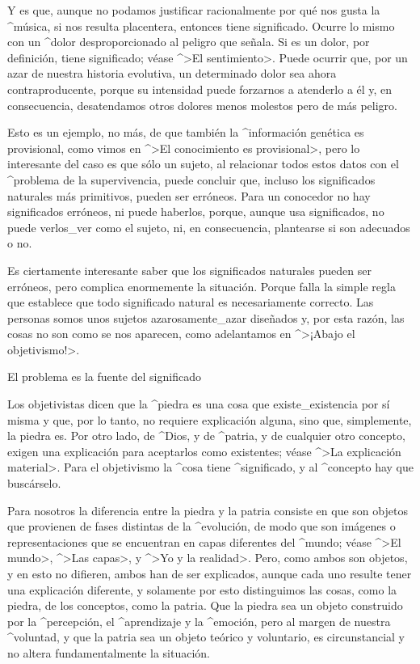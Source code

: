 Y es que, aunque no podamos justificar racionalmente por qué nos gusta
la ^{música}, si nos resulta placentera, entonces tiene significado.
Ocurre lo mismo con un ^{dolor} desproporcionado al peligro que señala.
Si es un dolor, por definición, tiene significado; véase ^>El
sentimiento>. Puede ocurrir que, por un azar de nuestra historia
evolutiva, un determinado dolor sea ahora contraproducente, porque su
intensidad puede forzarnos a atenderlo a él y, en consecuencia,
desatendamos otros dolores menos molestos pero de más peligro.

Esto es un ejemplo, no más, de que también la ^{información} genética es
provisional, como vimos en ^>El conocimiento es provisional>, pero lo
interesante del caso es que sólo un sujeto, al relacionar todos estos
datos con el ^{problema de la supervivencia}, puede concluir que,
incluso los significados naturales más primitivos, pueden ser erróneos.
Para un conocedor no hay significados erróneos, ni puede haberlos,
porque, aunque usa significados, no puede verlos_{ver} como el sujeto,
ni, en consecuencia, plantearse si son adecuados o no.

Es ciertamente interesante saber que los significados naturales pueden
ser erróneos, pero complica enormemente la situación. Porque falla la
simple regla que establece que todo significado natural es
necesariamente correcto. Las personas somos unos sujetos
azarosamente_{azar} diseñados y, por esta razón, las cosas no son como
se nos aparecen, como adelantamos en ^>¡Abajo el objetivismo!>.


\Section El problema es la fuente del significado

Los objetivistas dicen que la ^{piedra} es una cosa que
existe_{existencia} por sí misma y que, por lo tanto, no requiere
explicación alguna, sino que, simplemente, la piedra es. Por otro lado,
de ^{Dios}, y de ^{patria}, y de cualquier otro concepto, exigen una
explicación para aceptarlos como existentes; véase ^>La explicación
material>. Para el objetivismo la ^{cosa} tiene ^{significado}, y al
^{concepto} hay que buscárselo.

Para nosotros la diferencia entre la piedra y la patria consiste en que
son objetos que provienen de fases distintas de la ^{evolución}, de modo
que son imágenes o representaciones que se encuentran en capas
diferentes del ^{mundo}; véase ^>El mundo>, ^>Las capas>, y ^>Yo y la
realidad>. Pero, como ambos son objetos, y en esto no difieren, ambos
han de ser explicados, aunque cada uno resulte tener una explicación
diferente, y solamente por esto distinguimos las cosas, como la piedra,
de los conceptos, como la patria. Que la piedra sea un objeto construido
por la ^{percepción}, el ^{aprendizaje} y la ^{emoción}, pero al margen
de nuestra ^{voluntad}, y que la patria sea un objeto teórico y
voluntario, es circunstancial y no altera fundamentalmente la situación.

